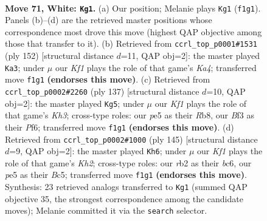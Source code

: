 \documentclass[11pt]{article}
\begin{document}
\clearpage

\begin{figure}[p]\centering
\begin{subfigure}{0.46\textwidth}\centering
\resizebox{\linewidth}{!}{%
\newchessgame
\chessboard[
  setfen={8/5k2/8/4p1p1/5p2/5B2/1r6/5K2 w - - 53 71},
  showmover=false,
  pgfstyle=straightmove, color=movearrow, markmove={f1-g1}
]}
\caption{}
\end{subfigure}\hfill
\begin{subfigure}{0.46\textwidth}\centering
\resizebox{\linewidth}{!}{%
\newchessgame
\chessboard[
  setfen={8/5p2/6p1/6B1/K5P1/8/5k2/8 w - - 4 77},
  showmover=false,
  pgfstyle=straightmove, color=movearrow, markmove={a4-a3}
]}
\caption{}
\end{subfigure}
\\[4pt]
\begin{subfigure}{0.46\textwidth}\centering
\resizebox{\linewidth}{!}{%
\newchessgame
\chessboard[
  setfen={1r6/R7/5p1k/5P2/6P1/8/6K1/8 b - - 0 69},
  showmover=false,
  pgfstyle=straightmove, color=movearrow, markmove={h6-g5}
]}
\caption{}
\end{subfigure}\hfill
\begin{subfigure}{0.46\textwidth}\centering
\resizebox{\linewidth}{!}{%
\newchessgame
\chessboard[
  setfen={8/7k/2B5/2b4p/5P1P/6P1/8/5K2 b - - 14 73},
  showmover=false,
  pgfstyle=straightmove, color=movearrow, markmove={h7-h6}
]}
\caption{}
\end{subfigure}
\caption{\textbf{Move 71, White: \texttt{Kg1}.} (a) Our position; Melanie plays \texttt{Kg1} (\texttt{f1g1}). Panels (b)--(d) are the retrieved master positions whose correspondence most drove this move (highest QAP objective among those that transfer to it). (b) Retrieved from \texttt{ccrl\_top\_p0001\#1531} (ply 152) [structural distance $d$=11, QAP obj=2]: the master played \texttt{Ka3}; under $\mu$ our \emph{Kf1} plays the role of that game's \emph{Ka4}; transferred move \texttt{f1g1} \textbf{(endorses this move)}. (c) Retrieved from \texttt{ccrl\_top\_p0002\#2260} (ply 137) [structural distance $d$=10, QAP obj=2]: the master played \texttt{Kg5}; under $\mu$ our \emph{Kf1} plays the role of that game's \emph{Kh3}; cross-type roles: our \emph{p}e5 as their \emph{R}b8, our \emph{B}f3 as their \emph{P}f6; transferred move \texttt{f1g1} \textbf{(endorses this move)}. (d) Retrieved from \texttt{ccrl\_top\_p0002\#1000} (ply 145) [structural distance $d$=9, QAP obj=2]: the master played \texttt{Kh6}; under $\mu$ our \emph{Kf1} plays the role of that game's \emph{Kh2}; cross-type roles: our \emph{r}b2 as their \emph{b}c6, our \emph{p}e5 as their \emph{B}c5; transferred move \texttt{f1g1} \textbf{(endorses this move)}. Synthesis: 23 retrieved analogs transferred to \texttt{Kg1} (summed QAP objective 35, the strongest correspondence among the candidate moves); Melanie committed it via the \texttt{search} selector.}
\label{fig:thought-m140}
\end{figure}
\end{document}
